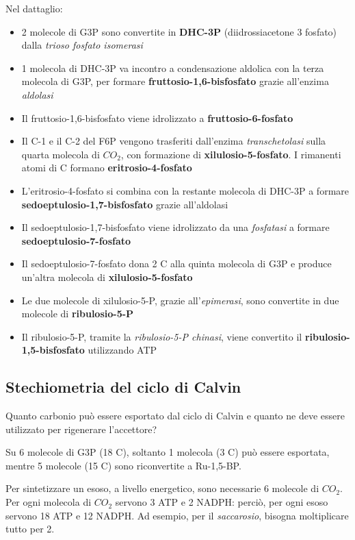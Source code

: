 \documentclass[a4paper,12pt]{book}
\begin{document}
Nel dattaglio:
\begin{itemize}
\item{2 molecole di G3P sono convertite in \textbf{DHC-3P} (diidrossiacetone 3 fosfato) dalla \emph{trioso fosfato isomerasi}}
\item{1 molecola di DHC-3P va incontro a condensazione aldolica con la terza molecola di G3P, per formare \textbf{fruttosio-1,6-bisfosfato} grazie all'enzima \emph{aldolasi}}
\item{Il fruttosio-1,6-bisfosfato viene idrolizzato a \textbf{fruttosio-6-fosfato}}
\item{Il C-1 e il C-2 del F6P vengono trasferiti dall'enzima \emph{transchetolasi} sulla quarta molecola di $CO_{2}$, con formazione di \textbf{xilulosio-5-fosfato}. I rimanenti atomi di C formano \textbf{eritrosio-4-fosfato}}
\item{L'eritrosio-4-fosfato si combina con la restante molecola di DHC-3P a formare \textbf{sedoeptulosio-1,7-bisfosfato} grazie all'aldolasi}
\item{Il sedoeptulosio-1,7-bisfosfato viene idrolizzato da una \emph{fosfatasi} a formare \textbf{sedoeptulosio-7-fosfato}}
\item{Il sedoeptulosio-7-fosfato dona 2 C alla quinta molecola di G3P e produce un'altra molecola di \textbf{xilulosio-5-fosfato}}
\item{Le due molecole di xilulosio-5-P, grazie all'\emph{epimerasi}, sono convertite in due molecole di \textbf{ribulosio-5-P}}
\item{Il ribulosio-5-P, tramite la \emph{ribulosio-5-P chinasi}, viene convertito il \textbf{ribulosio-1,5-bisfosfato} utilizzando ATP}
\end{itemize}

\subsection{Stechiometria del ciclo di Calvin}
Quanto carbonio può essere esportato dal ciclo di Calvin e quanto ne deve essere utilizzato per
rigenerare l’accettore?

Su 6 molecole di G3P (18 C), soltanto 1 molecola (3 C) può essere esportata, mentre 5
molecole (15 C) sono riconvertite a Ru-1,5-BP.

Per sintetizzare un esoso, a livello energetico, sono necessarie 6 molecole di $CO_{2}$. Per ogni molecola di $CO_{2}$ servono 3 ATP e 2 NADPH: perciò, per ogni esoso servono 18 ATP e 12 NADPH. Ad esempio, per il \emph{saccarosio}, bisogna moltiplicare tutto per 2.
\end{document}
